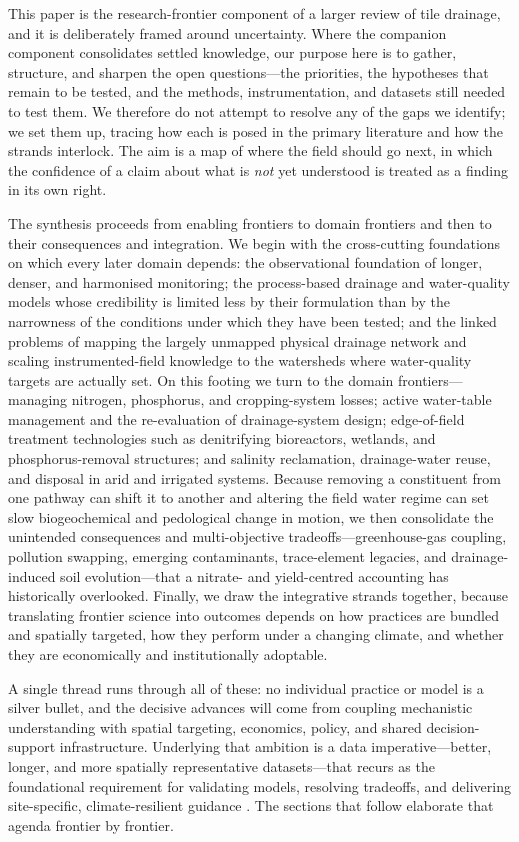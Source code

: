 \documentclass[11pt]{article}
\begin{document}
This paper is the research-frontier component of a larger review of tile
drainage, and it is deliberately framed around uncertainty. Where the
companion component consolidates settled knowledge, our purpose here is to
gather, structure, and sharpen the open questions---the priorities, the
hypotheses that remain to be tested, and the methods, instrumentation, and
datasets still needed to test them. We therefore do not attempt to resolve
any of the gaps we identify; we set them up, tracing how each is posed in
the primary literature and how the strands interlock. The aim is a map of
where the field should go next, in which the confidence of a claim about
what is \emph{not} yet understood is treated as a finding in its own right.

The synthesis proceeds from enabling frontiers to domain frontiers and
then to their consequences and integration. We begin with the cross-cutting
foundations on which every later domain depends: the observational
foundation of longer, denser, and harmonised monitoring; the process-based
drainage and water-quality models whose credibility is limited less by
their formulation than by the narrowness of the conditions under which they
have been tested; and the linked problems of mapping the largely unmapped
physical drainage network and scaling instrumented-field knowledge to the
watersheds where water-quality targets are actually set. On this footing we
turn to the domain frontiers---managing nitrogen, phosphorus, and
cropping-system losses; active water-table management and the re-evaluation
of drainage-system design; edge-of-field treatment technologies such as
denitrifying bioreactors, wetlands, and phosphorus-removal structures; and
salinity reclamation, drainage-water reuse, and disposal in arid and
irrigated systems. Because removing a constituent from one pathway can
shift it to another and altering the field water regime can set slow
biogeochemical and pedological change in motion, we then consolidate the
unintended consequences and multi-objective tradeoffs---greenhouse-gas
coupling, pollution swapping, emerging contaminants, trace-element
legacies, and drainage-induced soil evolution---that a nitrate- and
yield-centred accounting has historically overlooked. Finally, we draw the
integrative strands together, because translating frontier science into
outcomes depends on how practices are bundled and spatially targeted, how
they perform under a changing climate, and whether they are economically
and institutionally adoptable.

A single thread runs through all of these: no individual practice or model
is a silver bullet, and the decisive advances will come from coupling
mechanistic understanding with spatial targeting, economics, policy, and
shared decision-support infrastructure. Underlying that ambition is a data
imperative---better, longer, and more spatially representative
datasets---that recurs as the foundational requirement for validating
models, resolving tradeoffs, and delivering site-specific, climate-resilient
guidance \parencite{Ma2025,SKAGGS1994,Deng2011}. The sections that follow
elaborate that agenda frontier by frontier.

\printbibliography
\end{document}
